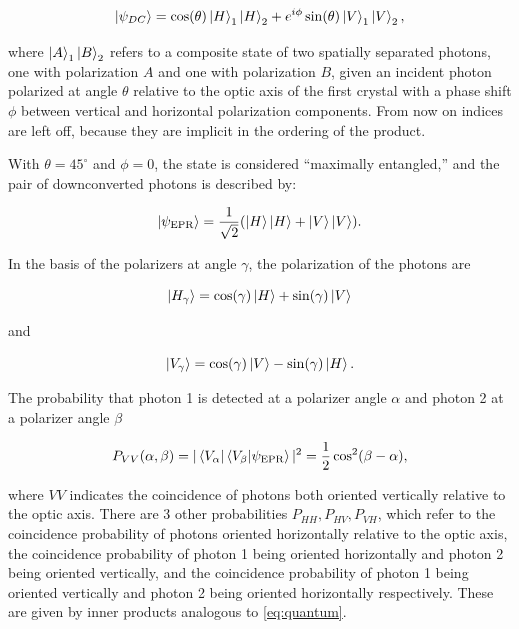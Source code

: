 \documentclass{article}
\begin{document}
\begin{equation}
  \ket{\psi_{DC}} = \cos(\theta) \ket{H}_1 \ket{H}_2 + e^{i\phi} \sin(\theta) \ket{V}_1 \ket{V}_2,\label{eq:dc}
\end{equation}

where $\ket{A}_1 \ket{B}_2$ refers to a composite state of two spatially separated photons, one with polarization $A$ and one with polarization $B$, given an incident photon polarized at angle $\theta$ relative to the optic axis of the first crystal with a phase shift $\phi$ between vertical and horizontal polarization components. From now on indices are left off, because they are implicit in the ordering of the product.

With $\theta = 45^{\circ}$ and $\phi = 0$, the state is considered ``maximally entangled,'' and the pair of downconverted photons is described by:\cite{dehlinger}

\begin{equation}
  \ket{\psi_{\text{EPR}}} = \frac{1}{\sqrt{2}}(\ket{H} \ket{H} + \ket{V} \ket{V}). \label{eq:epr}
\end{equation}

In the basis of the polarizers at angle $\gamma$, the  polarization of the photons are

\begin{equation}
  \ket{H_\gamma} = \cos(\gamma) \ket{H} + \sin(\gamma) \ket{V} \label{eq:h}
\end{equation}

and 

\begin{equation}
  \ket{V_\gamma} = \cos(\gamma) \ket{V} - \sin(\gamma) \ket{H}. \label{eq:v}
\end{equation}

The probability that photon 1 is detected at a polarizer angle $\alpha$ and photon 2 at a polarizer angle $\beta$

\begin{equation}
  P_{VV}(\alpha, \beta) = |\bra{V_\alpha}\bra{V_\beta} \ket{\psi_{\text{EPR}}}|^2 = \frac{1}{2} \cos^2(\beta-\alpha), \label{eq:quantum}
\end{equation}

where $VV$ indicates the coincidence of photons both oriented vertically relative to the optic axis. There are 3 other probabilities $P_{HH}, P_{HV}, P_{VH}$, which refer to the coincidence probability of photons oriented horizontally relative to the optic axis, the coincidence probability of photon 1 being oriented horizontally and photon 2 being oriented vertically, and the coincidence probability of photon 1 being oriented vertically and photon 2 being oriented horizontally respectively. These are given by inner products analogous to \ref{eq:quantum}.
\end{document}
